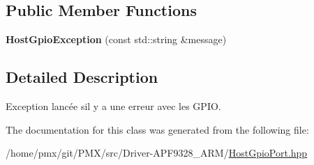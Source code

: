 \subsection*{Public Member Functions}
\begin{DoxyCompactItemize}
\item 
\mbox{\label{classHostGpioException_ad00145df60186e6d99fbb7a2d1bfd55d}} 
{\bfseries Host\+Gpio\+Exception} (const std\+::string \&message)
\end{DoxyCompactItemize}


\subsection{Detailed Description}
Exception lancée s\textquotesingle{}il y a une erreur avec les G\+P\+IO. 

The documentation for this class was generated from the following file\+:\begin{DoxyCompactItemize}
\item 
/home/pmx/git/\+P\+M\+X/src/\+Driver-\/\+A\+P\+F9328\+\_\+\+A\+R\+M/\hyperlink{HostGpioPort_8hpp}{Host\+Gpio\+Port.\+hpp}\end{DoxyCompactItemize}
